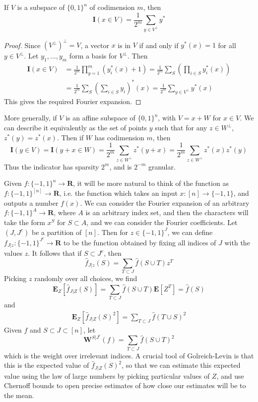 \begin{theorem}
    If $V$ is a subspace of $\{ 0, 1 \}^n$ of codimension $m$, then
    \[ \mathbf{I}(x \in V) = \frac{1}{2^m} \sum_{y \in V^\perp} y^* \]
\end{theorem}
\begin{proof}
    Since $(V^\perp)^\perp = V$, a vector $x$ is in $V$ if and only if $y^*(x) = 1$ for all $y \in V^\perp$. Let $y_1, \dots, y_m$ form a basis for $V^\perp$. Then
    \begin{align*}
        \mathbf{I}(x \in V) &= \frac{1}{2^m} \prod_{y = 1}^m \left( y_i^*(x) + 1 \right) = \frac{1}{2^m} \sum_S \left( \prod_{i \in S} y_i^*(x) \right)\\
        &= \frac{1}{2^m} \sum_S \left( \sum_{i \in S} y_i \right)^*(x) = \frac{1}{2^m} \sum_{y \in V^\perp} y^*(x)
    \end{align*}
    This gives the required Fourier expansion.
\end{proof}

More generally, if $V$ is an affine subspace of $\{ 0, 1 \}^n$, with $V = x + W$ for $x \in V$. We can describe it equivalently as the set of points $y$ such that for any $z \in W^\perp$, $z^*(y) = z^*(x)$. Then if $W$ has codimension $m$, then
%
\[ \mathbf{I}(y \in V) = \mathbf{I}(y + x \in W) = \frac{1}{2^m} \sum_{z \in W^\perp} z^*(y + x) = \frac{1}{2^m} \sum_{z \in W^\perp} z^*(x) z^*(y) \]
%
Thus the indicator has sparsity $2^m$, and is $2^{-m}$ granular.

Given $f: \{ -1, 1 \}^n \to \mathbf{R}$, it will be more natural to think of the function as $f: \{ -1, 1 \}^{[n]} \to \mathbf{R}$, i.e. the function which takes an input $x: [n] \to \{ -1, 1 \}$, and outputs a number $f(x)$. We can consider the Fourier expansion of an arbitrary $f: \{ -1, 1 \}^A \to \mathbf{R}$, where $A$ is an arbitrary index set, and then the characters will take the form $x^S$ for $S \subset A$, and we can consider the Fourier coefficients. Let $(J,J^c)$ be a partition of $[n]$. Then for $z \in \{ -1, 1 \}^J$, we can define $f_{J|z}: \{ -1, 1 \}^{J^c} \to \mathbf{R}$ to be the function obtained by fixing all indices of $J$ with the values $z$. It follows that if $S \subset J^c$, then
%
\[ \widehat{f}_{J|z}(S) = \sum_{T \subset J} \widehat{f}(S \cup T) z^T \]
%
Picking $z$ randomly over all choices, we find
%
\[ \mathbf{E}_Z[\widehat{f}_{J|Z}(S)] = \sum_{T \subset J} \widehat{f}(S \cup T) \mathbf{E}[Z^T] = \widehat{f}(S) \]
%
and
%
\begin{align*}
    \mathbf{E}_Z[\widehat{f}_{J|Z}(S)^2] = \sum_{T \subset J} \widehat{f}(T \cup S)^2
\end{align*}
%
Given $f$ and $S \subset J \subset [n]$, let
%
\[ \mathbf{W}^{S|J^c}(f) = \sum_{T \subset J} \widehat{f}(S \cup T)^2 \]
%
which is the weight over irrelevant indices. A crucial tool of Golreich-Levin is that this is the expected value of $\widehat{f}_{J|Z}(S)^2$, so that we can estimate this expected value using the law of large numbers by picking particular values of $Z$, and use Chernoff bounds to open precise estimates of how close our estimates will be to the mean.



